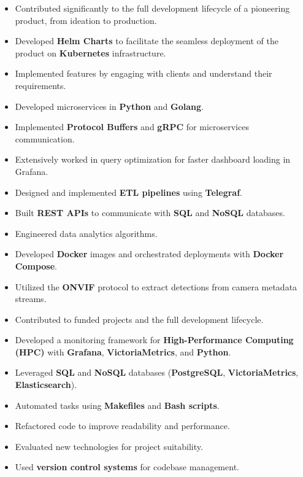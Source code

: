 \documentclass[10pt,a4paper,ragged2e,withhyper]{altacv}
\begin{document}
\begin{paracol}{2}



\begin{itemize}
      \item Contributed significantly to the full development lifecycle of a pioneering product, from ideation to production.
      \item Developed \textbf{Helm Charts} to facilitate the seamless deployment of the product on \textbf{Kubernetes} infrastructure.
      \item Implemented features by engaging with clients and understand their requirements.
      \item Developed microservices in \textbf{Python} and \textbf{Golang}.
      \item Implemented \textbf{Protocol Buffers} and \textbf{gRPC} for microservices communication.
      \item Extensively worked in query optimization for faster dashboard loading in Grafana.
      \item Designed and implemented \textbf{ETL pipelines} using \textbf{Telegraf}.
      \item Built \textbf{REST APIs} to communicate with \textbf{SQL} and \textbf{NoSQL} databases.
      \item Engineered data analytics algorithms.
      \item Developed \textbf{Docker} images and orchestrated deployments with
            \textbf{Docker Compose}.
    
      \item Utilized the \textbf{ONVIF} protocol to extract detections from camera metadata
            streams.
\end{itemize}

\bigskip


\begin{itemize}
      \item Contributed to funded projects and the full development lifecycle.
      \item Developed a monitoring framework for \textbf{High-Performance Computing (HPC)}
            with \textbf{Grafana}, \textbf{VictoriaMetrics}, and \textbf{Python}.
      \item Leveraged \textbf{SQL} and \textbf{NoSQL} databases (\textbf{PostgreSQL},
            \textbf{VictoriaMetrics}, \textbf{Elasticsearch}).
      \item Automated tasks using \textbf{Makefiles} and \textbf{Bash scripts}.
      \item Refactored code to improve readability and performance.
      \item Evaluated new technologies for project suitability.
      \item Used \textbf{version control systems} for codebase management.
\end{itemize}




\end{paracol}
\end{document}
